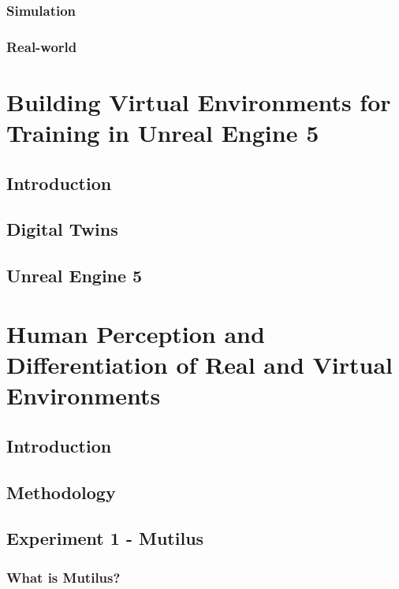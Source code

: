 \documentclass[12pt]{article}
\begin{document}
\subsubsection{Simulation}

\subsubsection{Real-world}

\section{Building Virtual Environments for Training in Unreal Engine 5}

\subsection{Introduction}

\subsection{Digital Twins}

\subsection{Unreal Engine 5}

\section{Human Perception and Differentiation of Real and Virtual Environments}

\subsection{Introduction}

\subsection{Methodology}

\subsection{Experiment 1 - Mutilus}

\subsubsection{What is Mutilus?}
\end{document}
